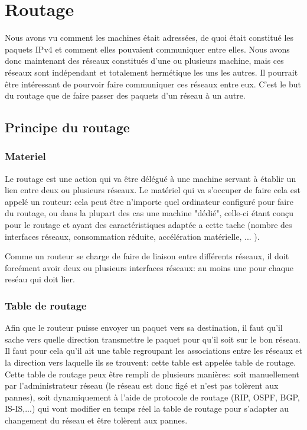 \section{Routage}

Nous avons vu comment les machines était adressées, de quoi était constitué les
paquets IPv4 et comment elles pouvaient communiquer entre elles.  Nous avons
donc maintenant des réseaux constitués d'une ou plusieurs machine, mais ces
réseaux sont indépendant et totalement hermétique les uns les autres. Il
pourrait être intéressant de pourvoir faire communiquer ces réseaux entre eux.
C'est le but du routage que de faire passer des paquets d'un réseau à un autre.

\subsection{Principe du routage}

\subsubsection{Materiel}
Le routage est une action qui va être délégué à une machine servant à établir
un lien entre deux ou plusieurs réseaux.  Le matériel qui va s'occuper de faire
cela est appelé un routeur: cela peut être n'importe quel ordinateur configuré
pour faire du routage, ou dans la plupart des cas une machine "dédié", celle-ci
étant conçu pour le routage et ayant des caractéristiques adaptée a cette tache
(nombre des interfaces réseaux, consommation réduite, accélération matérielle, ... ).

Comme un routeur se charge de faire de liaison entre différents réseaux, il doit
forcément avoir deux ou plusieurs interfaces réseaux: au moins une pour chaque
reséau qui doit lier.

\subsubsection{Table de routage}
Afin que le routeur puisse envoyer un paquet vers sa destination, il faut qu'il
sache vers quelle direction transmettre le paquet pour qu'il soit sur le bon
réseau. Il faut pour cela qu'il ait une table regroupant les associations entre
les réseaux et la direction vers laquelle ils se trouvent: cette table est
appelée table de routage.  Cette table de routage peux être rempli de plusieurs
manières: soit manuellement par l'administrateur réseau (le réseau est donc
figé et n'est pas tolèrent aux pannes), soit dynamiquement à l'aide de
protocole de routage (RIP, OSPF, BGP, IS-IS,...) qui vont modifier en temps
réel la table de routage pour s'adapter au changement du réseau et être
tolèrent aux pannes.

